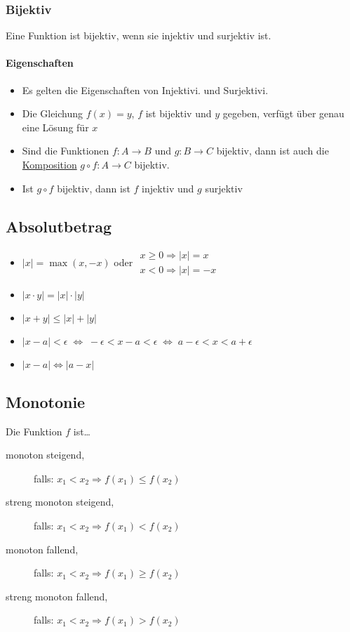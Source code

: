 \subsubsection{Bijektiv}
Eine Funktion ist bijektiv, wenn sie injektiv und surjektiv ist.

\vspace{-0.5cm}
\paragraph{Eigenschaften}
\begin{itemize}
	\item Es gelten die Eigenschaften von Injektivi. und Surjektivi.
	\item Die Gleichung $f(x) = y$, $f$ ist bijektiv und $y$ gegeben, verfügt über genau eine Lösung für $x$
	\item Sind die Funktionen $f: A \rightarrow B$ und $g: B \rightarrow C$ bijektiv, dann ist auch die \underline{Komposition} $g \circ f: A \rightarrow C$ bijektiv.
	\item Ist $g \circ f$ bijektiv, dann ist $f$ injektiv und $g$ surjektiv
\end{itemize}

\subsection{Absolutbetrag}
\begin{itemize}
	\item $|x| = \max(x, -x)$ oder 
	$\begin{array}{l}
		x \geq 0 \Rightarrow |x| = x \\
		x < 0 \Rightarrow |x| = -x
	\end{array}$
	\item $|x \cdot y| = |x| \cdot |y|$
	\item $|x + y| \leq |x| + |y|$
	\item $|x - a| < \epsilon \; \Leftrightarrow \;  -\epsilon < x- a < \epsilon \; \Leftrightarrow \; a - \epsilon < x < a + \epsilon$
	\item $|x - a| \Leftrightarrow |a - x|$
\end{itemize}

\subsection{Monotonie}
Die Funktion $f$ ist\ldots
\begin{description}
	\item[monoton steigend,] falls: $x_1 < x_2 \Rightarrow f(x_1) \leq f(x_2)$
	\item[streng monoton steigend,] falls: $x_1 < x_2 \Rightarrow f(x_1) < f(x_2)$
	\item[monoton fallend,] falls: $x_1 < x_2 \Rightarrow f(x_1) \geq f(x_2)$
	\item[streng monoton fallend,] falls: $x_1 < x_2 \Rightarrow f(x_1) > f(x_2)$
\end{description}

